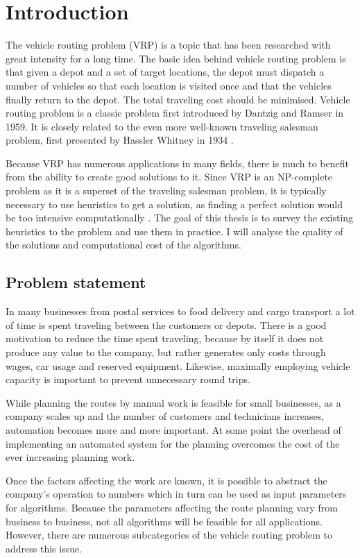 \chapter{Introduction}
\label{chapter:intro}

The vehicle routing problem (VRP) is a topic that has been researched with great intensity for a long time. The basic idea behind vehicle routing problem is that given a depot and a set of target locations, the depot must dispatch a number of vehicles so that each location is visited once and that the vehicles finally return to the depot. The total traveling cost should be minimised. Vehicle routing problem is a classic problem first introduced by Dantzig and Ramser in 1959. \cite{dantzig1959truck} It is closely related to the even more well-known traveling salesman problem, first presented by Hassler Whitney in 1934 \cite{flood1956traveling}. 

Because VRP has numerous applications in many fields, there is much to benefit from the ability to create good solutions to it. Since VRP is an NP-complete problem as it is a superset of the traveling salesman problem, it is typically necessary to use heuristics to get a solution, as finding a perfect solution would be too intensive computationally \cite{laporte2007you}. The goal of this thesis is to survey the existing heuristics to the problem and use them in practice. I will analyse the quality of the solutions and computational cost of the algorithms.

\section{Problem statement} 
In many businesses from postal services to food delivery and cargo transport a lot of time is spent traveling between the customers or depots. There is a good motivation to reduce the time spent traveling, because by itself it does not produce any value to the company, but rather generates only costs through wages, car usage and reserved equipment. Likewise, maximally employing vehicle capacity is important to prevent unnecessary round trips.  

While planning the routes by manual work is feasible for small businesses, as a company scales up and the number of customers and technicians increases, automation becomes more and more important. At some point the overhead of implementing an automated system for the planning overcomes the cost of the ever increasing planning work.

Once the factors affecting the work are known, it is possible to abstract the company's operation to numbers which in turn can be used as input parameters for algorithms. Because the parameters affecting the route planning vary from business to business, not all algorithms will be feasible for all applications. However, there are numerous subcategories of the vehicle routing problem to address this issue. 

